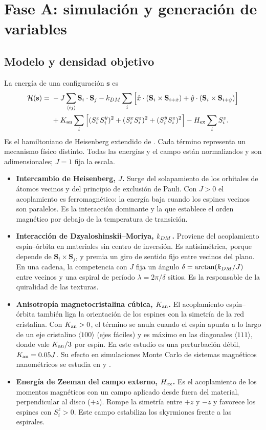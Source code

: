 \section{Fase A: simulación y generación de variables}

\subsection{Modelo y densidad objetivo}

La energía de una configuración $\mathbf s$ es
\begin{equation}
\begin{split}
\mathcal H(\mathbf s)={}&-J\sum_{\langle ij\rangle}\mathbf S_i\cdot\mathbf S_j
-k_{DM}\sum_i\Big[\hat x\cdot(\mathbf S_i\times\mathbf S_{i+\hat x})+\hat y\cdot(\mathbf S_i\times\mathbf S_{i+\hat y})\Big]\\
&+K_{\mathrm{an}}\sum_i\Big[(S_i^xS_i^y)^2+(S_i^xS_i^z)^2+(S_i^yS_i^z)^2\Big]-H_{\mathrm{ex}}\sum_i S_i^z .
\end{split}
\label{eq:hamiltoniano}
\end{equation}
Es el hamiltoniano de Heisenberg extendido de \citet{mendezrondon2026}. Cada término representa un mecanismo físico distinto. Todas las energías y el campo están normalizados y son adimensionales; $J=1$ fija la escala.
\begin{itemize}
\item \textbf{Intercambio de Heisenberg, $J$.} Surge del solapamiento de los orbitales de átomos vecinos y del principio de exclusión de Pauli. Con $J>0$ el acoplamiento es ferromagnético: la energía baja cuando los espines vecinos son paralelos. Es la interacción dominante y la que establece el orden magnético por debajo de la temperatura de transición.
\item \textbf{Interacción de Dzyaloshinskii--Moriya, $k_{DM}$.} Proviene del acoplamiento espín--órbita en materiales sin centro de inversión. Es antisimétrica, porque depende de $\mathbf S_i\times\mathbf S_j$, y premia un giro de sentido fijo entre vecinos del plano. En una cadena, la competencia con $J$ fija un ángulo $\delta=\arctan(k_{DM}/J)$ entre vecinos y una espiral de período $\lambda=2\pi/\delta$ sitios. Es la responsable de la quiralidad de las texturas.
\item \textbf{Anisotropía magnetocristalina cúbica, $K_{\mathrm{an}}$.} El acoplamiento espín--órbita también liga la orientación de los espines con la simetría de la red cristalina. Con $K_{\mathrm{an}}>0$, el término se anula cuando el espín apunta a lo largo de un eje cristalino $\langle100\rangle$ (ejes fáciles) y es máximo en las diagonales $\langle111\rangle$, donde vale $K_{\mathrm{an}}/3$ por espín. En este estudio es una perturbación débil, $K_{\mathrm{an}}=0.05J$. Su efecto en simulaciones Monte Carlo de sistemas magnéticos nanométricos se estudia en \citet{agudelo2016} y \citet{agudelo2023}.
\item \textbf{Energía de Zeeman del campo externo, $H_{\mathrm{ex}}$.} Es el acoplamiento de los momentos magnéticos con un campo aplicado desde fuera del material, perpendicular al disco ($+z$). Rompe la simetría entre $+z$ y $-z$ y favorece los espines con $S_i^z>0$. Este campo estabiliza los skyrmiones frente a las espirales.
\end{itemize}
